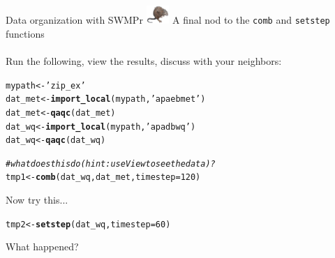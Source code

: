 \documentclass[xcolor=dvipsnames,serif]{beamer}\usepackage[]{graphicx}\usepackage[]{color}
\makeatletter
\newcommand{\hlnum}[1]{\textcolor[rgb]{0.686,0.059,0.569}{#1}}%
\newcommand{\hlstr}[1]{\textcolor[rgb]{0.192,0.494,0.8}{#1}}%
\newcommand{\hlcom}[1]{\textcolor[rgb]{0.678,0.584,0.686}{\textit{#1}}}%
\newcommand{\hlstd}[1]{\textcolor[rgb]{0.345,0.345,0.345}{#1}}%
\newcommand{\hlkwb}[1]{\textcolor[rgb]{0.69,0.353,0.396}{#1}}%
\newcommand{\hlkwc}[1]{\textcolor[rgb]{0.333,0.667,0.333}{#1}}%
\newcommand{\hlkwd}[1]{\textcolor[rgb]{0.737,0.353,0.396}{\textbf{#1}}}%
\newenvironment{kframe}{%
 \def\at@end@of@kframe{}%
 \ifinner\ifhmode%
  \def\at@end@of@kframe{\end{minipage}}%
  \begin{minipage}{\columnwidth}%
 \fi\fi%
 \def\FrameCommand##1{\hskip\@totalleftmargin \hskip-\fboxsep
 \colorbox{shadecolor}{##1}\hskip-\fboxsep
     \hskip-\linewidth \hskip-\@totalleftmargin \hskip\columnwidth}%
 \MakeFramed {\advance\hsize-\width
   \@totalleftmargin\z@ \linewidth\hsize
   \@setminipage}}%
 {\par\unskip\endMakeFramed%
 \at@end@of@kframe}
\newenvironment{knitrout}{}{} %
\makeatother
\begin{document}
\begin{frame}[fragile]{Data organization with SWMPr \includegraphics[width = 0.065\textwidth]{imgs/swmprat.png}}
\onslide<+->
A final nod to the \texttt{comb} and \texttt{setstep} functions \\~\\
Run the following, view the results, discuss with your neighbors:
\begin{knitrout}\scriptsize
{}\color{fgcolor}\begin{kframe}
\begin{alltt}
\hlstd{mypath} \hlkwb{<-} \hlstr{'zip_ex'}
\hlstd{dat_met} \hlkwb{<-} \hlkwd{import_local}\hlstd{(mypath,} \hlstr{'apaebmet'}\hlstd{)}
\hlstd{dat_met} \hlkwb{<-} \hlkwd{qaqc}\hlstd{(dat_met)}
\hlstd{dat_wq} \hlkwb{<-} \hlkwd{import_local}\hlstd{(mypath,} \hlstr{'apadbwq'}\hlstd{)}
\hlstd{dat_wq} \hlkwb{<-} \hlkwd{qaqc}\hlstd{(dat_wq)}

\hlcom{# what does this do (hint: use View to see the data)?}
\hlstd{tmp1} \hlkwb{<-} \hlkwd{comb}\hlstd{(dat_wq, dat_met,} \hlkwc{timestep} \hlstd{=} \hlnum{120}\hlstd{)}
\end{alltt}
\end{kframe}
\end{knitrout}
\onslide<+->
Now try this...
\begin{knitrout}\scriptsize
{}\color{fgcolor}\begin{kframe}
\begin{alltt}
\hlstd{tmp2} \hlkwb{<-} \hlkwd{setstep}\hlstd{(dat_wq,} \hlkwc{timestep} \hlstd{=} \hlnum{60}\hlstd{)}
\end{alltt}
\end{kframe}
\end{knitrout}
What happened?
\end{frame}
\end{document}
